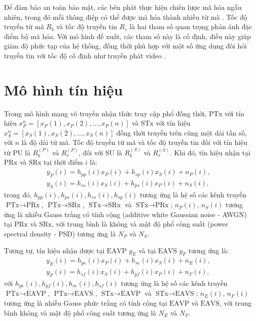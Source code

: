\documentclass[../main.tex]{subfiles}
\begin{document}
Để đảm bảo an toàn bảo mật, các bên phát thực hiện chiến lược mã hóa ngẫu nhiên, trong đó mỗi thông điệp có thể được mã hóa thành nhiều từ mã \cite{wyner}. Tốc độ truyền từ mã $R_b$ và tốc độ truyền tin $R_s$ là hai tham số quan trọng phản ánh đặc điểm bộ mã hóa. Với mô hình đề xuất, các tham số này là cố định, điều này giúp giảm độ phức tạp của hệ thống, đồng thời phù hợp với một số ứng dụng đòi hỏi truyền tin với tốc độ cố định như truyền phát video \cite{he2016secrecy}.

\section{Mô hình tín hiệu}

Trong mô hình mạng vô truyến nhận thức truy cập phổ đồng thời, $\text{PTx}$ với tín hiệu $x_P^n=\left[x_P(1), x_P(2),..., x_P(n)\right]$ và $\text{STx}$ với tín hiệu $x_S^n=\left[x_S(1), x_S(2),..., x_S(n)\right]$ đồng thời truyền trên cùng một dải tần số, với $n$ là độ dài từ mã. Tốc độ truyền từ mã và tốc độ truyền tin đối với tín hiệu từ PU là $R_b^{(P)}$ và ${R_s^{(P)}}$, đối với SU là $R_b^{(S)}$ và ${R_s^{(S)}}$. Khi đó, tín hiệu nhận tại $\text{PRx}$ và $\text{SRx}$ tại thời điểm $i$ là:
\begin{align*}
y_P(i) = h_{pp}(i)x_P(i) + h_{sp}(i)x_S(i) + n_P(i), \\
y_S(i) = h_{ss}(i)x_S(i) + h_{ps}(i)x_P(i) + n_S(i),
\end{align*}
trong đó, $h_{pp}(i), h_{ps}(i), h_{ss}(i), h_{sp}(i)$ tương ứng là hệ số các kênh truyền $\text{PTx}\rightarrow\text{PRx}$, $\text{PTx}\rightarrow\text{SRx}$, $\text{STx}\rightarrow\text{SRx}$ và $\text{STx}\rightarrow\text{PRx}$; $n_P(i)$, $n_S(i)$ tương ứng là nhiễu Gauss trắng có tính cộng (additive white Gaussian noise - AWGN) tại $\text{PRx}$ và $\text{SRx}$, với trung bình là không và mật độ phổ công suất (power spectral density - PSD) tương ứng là $N_P$ và $N_S$.

Tương tự, tín hiệu nhận được tại $\text{EAVP}$ $y_E$ và tại $\text{EAVS}$ $y_F$ tương ứng là:
\begin{align*}
y_E(i) = h_{pe}(i)x_P(i) + h_{se}(i)x_S(i) + n_E(i), \\
y_F(i) = h_{sf}(i)x_S(i) + h_{pf}(i)x_P(i) + n_F(i),
\end{align*}
với $h_{pe}(i), h_{pf}(i), h_{se}(i), h_{sf}(i)$ tương ứng là hệ số các kênh truyền $\text{PTx}\rightarrow\text{EAVP}$, $\text{PTx}\rightarrow\text{EAVS}$, $\text{STx}\rightarrow\text{EAVP}$ và $\text{STx}\rightarrow\text{EAVS}$; $n_E(i)$, $n_F(i)$ tương ứng là nhiễu Gauss phức trắng có tính cộng tại $\text{EAVP}$ và $\text{EAVS}$, với trung bình không và mật độ phổ công suất tương ứng là $N_E$ và $N_F$.
\end{document}
